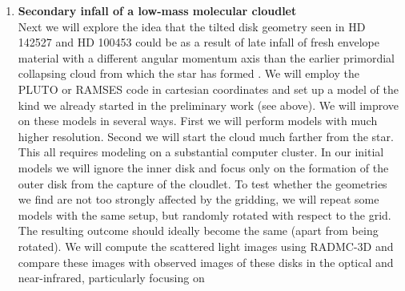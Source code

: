 \documentclass[10pt,fleqn,twoside]{article}
\begin{document}
\begin{enumerate}
\item {\bf Secondary infall of a low-mass molecular cloudlet}\label{subproj-infall-largescale}\\
  Next we will explore the idea that the tilted disk geometry seen in HD
  142527 and HD 100453 could be as a result of late infall of fresh envelope
  material with a different angular momentum axis than the earlier
  primordial collapsing cloud from which the star has formed \citep[the
  scenario by][but now applied to disks]{2011MNRAS.417.1817T}. We will
  employ the PLUTO or RAMSES code in cartesian coordinates and set up a
  model of the kind we already started in the preliminary work (see above).
  We will improve on these models in several ways. First we will perform
  models with much higher resolution. Second we will start the cloud much
  farther from the star. This all requires modeling on a substantial computer
  cluster. In our initial models we will ignore the inner disk and focus
  only on the formation of the outer disk from the capture of the cloudlet.
  To test whether the geometries we find are not too strongly affected by
  the gridding, we will repeat some models with the same setup, but randomly
  rotated with respect to the grid. The resulting outcome should ideally
  become the same (apart from being rotated). We will compute the scattered
  light images using RADMC-3D and compare these images with observed images
  of these disks in the optical and near-infrared, particularly focusing on

\end{enumerate}
\end{document}
